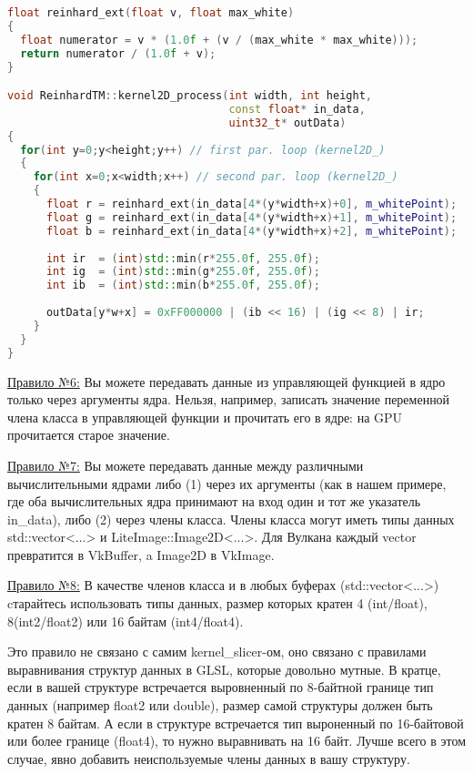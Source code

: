 \documentclass[11pt,fleqn,english,russian]{report} %
\begin{document}
\begin{lstlisting}[language=C++, 
	               caption=двумерное вычислительное ядро вызывает функцию reinhard\_ext, 
	               label=lst:kernel2D_process]	
float reinhard_ext(float v, float max_white)
{
  float numerator = v * (1.0f + (v / (max_white * max_white)));
  return numerator / (1.0f + v);
}

void ReinhardTM::kernel2D_process(int width, int height, 
                                  const float* in_data, 
                                  uint32_t* outData)
{
  for(int y=0;y<height;y++) // first par. loop (kernel2D_)
  {
    for(int x=0;x<width;x++) // second par. loop (kernel2D_)
    {
      float r = reinhard_ext(in_data[4*(y*width+x)+0], m_whitePoint);
      float g = reinhard_ext(in_data[4*(y*width+x)+1], m_whitePoint);
      float b = reinhard_ext(in_data[4*(y*width+x)+2], m_whitePoint);
			
      int ir  = (int)std::min(r*255.0f, 255.0f);
      int ig  = (int)std::min(g*255.0f, 255.0f);
      int ib  = (int)std::min(b*255.0f, 255.0f);
			
      outData[y*w+x] = 0xFF000000 | (ib << 16) | (ig << 8) | ir;
    }
  }
}
\end{lstlisting}


\underline{Правило №6:} Вы можете передавать данные из управляющей функцией в ядро только через аргументы ядра. Нельзя, например, записать значение переменной члена класса в управляющей функции и прочитать его в ядре: на GPU прочитается старое значение.

\underline{Правило №7:} Вы можете передавать данные между различными вычислительными ядрами либо (1) через их аргументы (как в нашем примере, где оба вычислительных ядра принимают на вход один и тот же указатель in\_data), либо (2) через члены класса. Члены класса могут иметь типы данных std::vector<...> и LiteImage::Image2D<...>. Для Вулкана каждый vector превратится в VkBuffer, a Image2D в VkImage.

\underline{Правило №8:} В качестве членов класса и в любых буферах (std::vector<...>) cтарайтесь использовать типы данных, размер которых кратен 4 (int/float), 8(int2/float2) или 16 байтам (int4/float4). 

\begin{remark}
Это правило не связано с самим kernel\_slicer-ом, оно связано с правилами выравнивания структур данных в GLSL, которые довольно мутные. В кратце, если в вашей структуре встречается выровненный по 8-байтной границе тип данных (например float2 или double), размер самой структуры должен быть кратен 8 байтам. А если в структуре встречается тип выроненный по 16-байтовой или более границе (float4), то нужно выравнивать на 16 байт. Лучше всего в этом случае, явно добавить неиспользуемые члены данных в вашу структуру.
\end{remark}
\end{document}
